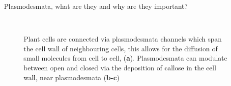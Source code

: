\documentclass[final]{beamer}
\begin{document}
\begin{frame}{}
\begin{textblock}{28}
\begin{block}{Plasmodesmata, what are they and why are they important?}
      \begin{figure}[!ht]
        \centering
        \\
        \hfill

        \caption[pd]{Plant cells are connected via plasmodesmata
          channels which span the cell wall of neighbouring cells,
          this allows for the diffusion of small molecules from
          cell to cell, (\textbf{a}). Plasmodesmata can
          modulate between open and closed via the deposition of callose in
          the cell wall, near plasmodesmata (\textbf{b-c})}
        \label{fig:pd}
      \end{figure}


\end{block}
\end{textblock}
\end{frame}
\end{document}
